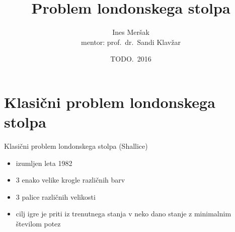 \documentclass[dvipsnames]{beamer}
\title{Problem londonskega stolpa}
\author[Ines Meršak]{Ines Meršak \\[5px] mentor: prof.~dr.~Sandi Klavžar}
\date{TODO.~2016}
\begin{document}
    
\begin{frame}[plain]
    \titlepage
\end{frame}


\section{Klasični problem londonskega stolpa}
\begin{frame}{Klasični problem londonskega stolpa (Shallice)}
    \begin{itemize}
        \item izumljen leta 1982
        \item 3 enako velike krogle različnih barv
        \item 3 palice različnih velikosti
        \item cilj igre je priti iz trenutnega stanja v neko dano stanje z minimalnim številom potez
    \end{itemize}
\end{frame}
\end{document}
